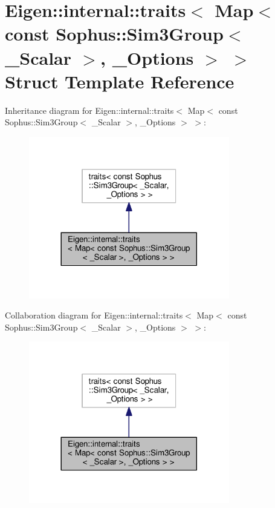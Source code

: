 \hypertarget{struct_eigen_1_1internal_1_1traits_3_01_map_3_01const_01_sophus_1_1_sim3_group_3_01___scalar_01_4_00_01___options_01_4_01_4}{}\section{Eigen\+:\+:internal\+:\+:traits$<$ Map$<$ const Sophus\+:\+:Sim3\+Group$<$ \+\_\+\+Scalar $>$, \+\_\+\+Options $>$ $>$ Struct Template Reference}
\label{struct_eigen_1_1internal_1_1traits_3_01_map_3_01const_01_sophus_1_1_sim3_group_3_01___scalar_01_4_00_01___options_01_4_01_4}


Inheritance diagram for Eigen\+:\+:internal\+:\+:traits$<$ Map$<$ const Sophus\+:\+:Sim3\+Group$<$ \+\_\+\+Scalar $>$, \+\_\+\+Options $>$ $>$\+:
\nopagebreak
\begin{figure}[H]
\begin{center}
\leavevmode
\includegraphics[width=248pt]{struct_eigen_1_1internal_1_1traits_3_01_map_3_01const_01_sophus_1_1_sim3_group_3_01___scalar_01_6359c2cbf8fcc77d54a9a9d69f096544}
\end{center}
\end{figure}


Collaboration diagram for Eigen\+:\+:internal\+:\+:traits$<$ Map$<$ const Sophus\+:\+:Sim3\+Group$<$ \+\_\+\+Scalar $>$, \+\_\+\+Options $>$ $>$\+:
\nopagebreak
\begin{figure}[H]
\begin{center}
\leavevmode
\includegraphics[width=248pt]{struct_eigen_1_1internal_1_1traits_3_01_map_3_01const_01_sophus_1_1_sim3_group_3_01___scalar_01_4099b912049e4b7374d31dd9d38ebf7f}
\end{center}
\end{figure}
